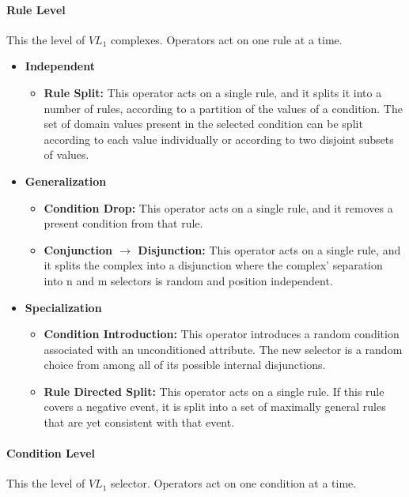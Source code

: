 \documentclass[../main.tex]{subfiles}
\begin{document}
\paragraph{Rule Level} This the level of $VL_1$ complexes. Operators act on one rule at a time.

\begin{itemize}
	\item \textbf{Independent}
	\begin{itemize}
		\item \textbf{Rule Split:} This operator acts on a single rule, and it splits it into a number of rules,
		according to a partition of the values of a condition. The set of domain values present in the selected
		condition can be split according to each value individually or according to two disjoint subsets of values.
	\end{itemize}
	\item \textbf{Generalization}
	\begin{itemize}
		\item \textbf{Condition Drop:} This operator acts on a single rule, and it removes a present condition from
		that rule.
		\item \textbf{Conjunction $\rightarrow$ Disjunction:} This operator acts on a single rule, and it splits the
		complex into a disjunction where the complex' separation into n and m selectors is random and position
		independent.
	\end{itemize}
	\item \textbf{Specialization}
	\begin{itemize}
		\item \textbf{Condition Introduction:} This operator introduces a random condition associated with an
		unconditioned attribute. The new selector is a random choice from among all of its possible internal
		disjunctions.
		\item \textbf{Rule Directed Split:}  This operator acts on a single rule. If this rule covers a negative event,
		it is split into a set of maximally general rules that are yet consistent with that event.
	\end{itemize}
\end{itemize}

\paragraph{Condition Level} This the level of $VL_1$ selector. Operators act on one condition at a time.
\end{document}
